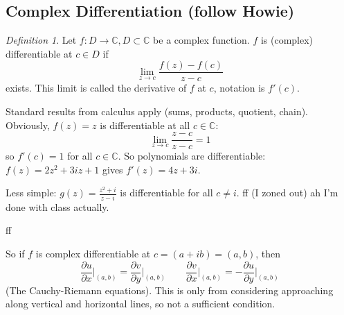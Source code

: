 \documentclass{article}
\theoremstyle{plain}
\theoremstyle{remark}
\newtheorem{definition}{Definition}
\newcommand{\C}{{\mathbb C}}
\begin{document}
\subsection{Complex Differentiation (follow Howie)}
\begin{definition}
	Let $f \colon D \to \C, D \subset \C$ be a complex function.
	$f$ is (complex) differentiable at $c \in D$ if
	\[
		\lim_{z \to c} \frac{f(z) - f(c)}{z-c}
	\]
	exists.
	This limit is called the derivative of $f$ at $c$,
	notation is $f'(c)$.
\end{definition}

Standard results from calculus apply (sums, products, quotient, chain).
Obviously, $f(z) = z$ is differentiable at all $c \in \C$:
\[
	\lim_{z\to c} \frac{z-c}{z-c} = 1
\]
so $f'(c) = 1$ for all $c \in \C$.
So polynomials are differentiable: $f(z) = 2z^2 + 3iz + 1$
gives $f'(z) = 4z + 3i$.

Less simple: $g(z) = \frac{z^2 + i}{z-i}$ is differentiable for all $c \neq i$.
ff (I zoned out) ah I'm done with class actually.

ff

So if $f$ is complex differentiable at $c = (a+ib) = (a,b)$, then
\[
	\frac{\partial u}{\partial x}\vert_{(a,b)} = \frac{\partial v}{\partial y}\vert_{(a,b)}
	\qquad
	\frac{\partial v}{\partial x}\vert_{(a,b)} = -\frac{\partial u}{\partial y}\vert_{(a,b)}
\]
(The Cauchy-Riemann equations).
This is only from considering approaching along vertical and horizontal lines,
so not a sufficient condition.
\end{document}
